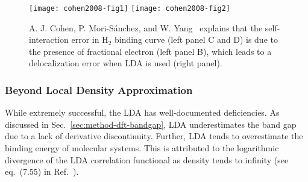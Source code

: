 \begin{figure}[h]
\texttt{[image: cohen2008-fig1]}
\texttt{[image: cohen2008-fig2]}
\caption{A. J. Cohen, P. Mori-S\'anchez, and W. Yang~\cite{Cohen2008} explains that the self-interaction error in H$_2$ binding curve (left panel C and D) is due to the presence of fractional electron (left panel B), which leads to a delocalization error when LDA is used (right panel).}
\label{fig:method-dft-smooth-lda}
\end{figure}


\subsubsection{Beyond Local Density Approximation}

While extremely successful, the LDA has well-documented deficiencies.
As discussed in Sec.~\ref{sec:method-dft-bandgap}, LDA underestimates the band gap due to a lack of derivative discontinuity.
Further, LDA tends to overestimate the binding energy of molecular systems. This is attributed to the logarithmic divergence of the LDA correlation functional as density tends to infinity (see eq.~(7.55) in Ref.~\cite{Giuliani2005}).

